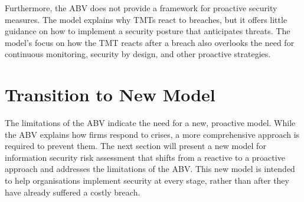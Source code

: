     Furthermore, the ABV does not provide a framework for proactive security measures. The model explains why TMTs react to breaches, but it offers little guidance on how to implement a security posture that anticipates threats. The model's focus on how the TMT reacts after a breach also overlooks the need for continuous monitoring, security by design, and other proactive strategies.

\section{Transition to New Model}
The limitations of the ABV indicate the need for a new, proactive model. While the ABV explains how firms respond to crises, a more comprehensive approach is required to prevent them. The next section will present a new model for information security risk assessment that shifts from a reactive to a proactive approach and addresses the limitations of the ABV. This new model is intended to help organisations implement security at every stage, rather than after they have already suffered a costly breach.
